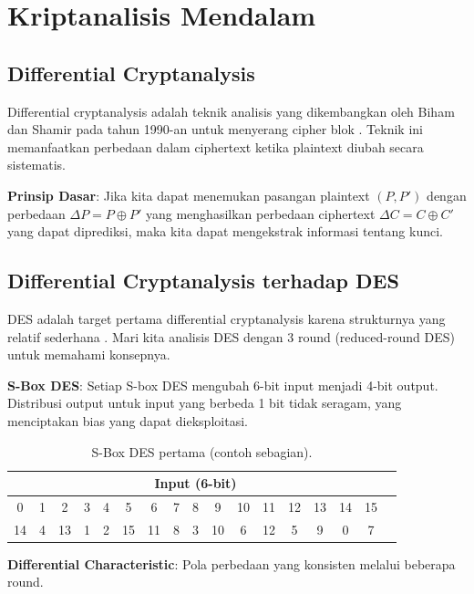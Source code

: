 ﻿\section{Kriptanalisis Mendalam}

\subsection{Differential Cryptanalysis}

Differential cryptanalysis adalah teknik analisis yang dikembangkan oleh Biham dan Shamir pada tahun 1990-an untuk menyerang cipher blok \cite{biham1993}. Teknik ini memanfaatkan perbedaan dalam ciphertext ketika plaintext diubah secara sistematis.

\textbf{Prinsip Dasar}: Jika kita dapat menemukan pasangan plaintext $(P, P')$ dengan perbedaan $\Delta P = P \oplus P'$ yang menghasilkan perbedaan ciphertext $\Delta C = C \oplus C'$ yang dapat diprediksi, maka kita dapat mengekstrak informasi tentang kunci.

\subsection{Differential Cryptanalysis terhadap DES}

DES adalah target pertama differential cryptanalysis karena strukturnya yang relatif sederhana \cite{biham1993}. Mari kita analisis DES dengan 3 round (reduced-round DES) untuk memahami konsepnya.

\textbf{S-Box DES}: Setiap S-box DES mengubah 6-bit input menjadi 4-bit output. Distribusi output untuk input yang berbeda 1 bit tidak seragam, yang menciptakan bias yang dapat dieksploitasi.

\begin{table}[htbp]
  \centering
  \small
  \begin{tabular}{|c|c|c|c|c|c|c|c|c|c|c|c|c|c|c|c|c|}
    \hline
    \multicolumn{16}{|c|}{Input (6-bit)} \\
    \hline
    0 & 1 & 2 & 3 & 4 & 5 & 6 & 7 & 8 & 9 & 10 & 11 & 12 & 13 & 14 & 15 \\
    \hline
    14 & 4 & 13 & 1 & 2 & 15 & 11 & 8 & 3 & 10 & 6 & 12 & 5 & 9 & 0 & 7 \\
    \hline
  \end{tabular}
  \caption{S-Box DES pertama (contoh sebagian).}
\end{table}

\textbf{Differential Characteristic}: Pola perbedaan yang konsisten melalui beberapa round.

